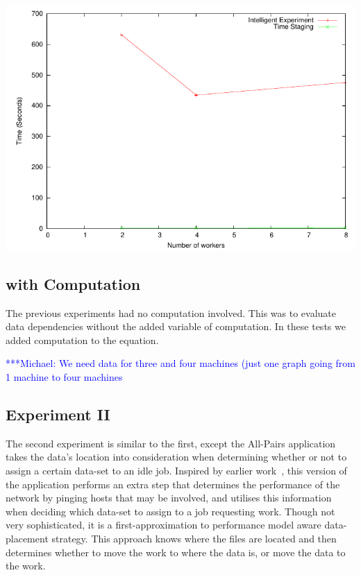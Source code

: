 \documentclass{rspublic}
\newcommand{\micnote}[1]{ {\textcolor{blue} { ***Michael: #1 }}} \else
\newcommand{\jhanote}[1]{} \newcommand{\micnote}[1]{} \newcommand{\fixme}[1]{}
\begin{document}
\includegraphics{data/graphs/StagingAsAPortionOfIntelligenceFigure}

\subsection{with Computation}
The previous experiments had no computation involved.  This was to
evaluate data dependencies without the added variable of computation.
In these tests we added computation to the equation.

\jhanote{We need data for compute (comparision) and I/O (only) for
different data-set sizes} \micnote{We need data for three and four
machines (just one graph going from 1 machine to four machines}

\subsection{Experiment II} The second experiment is similar to the
first, except the All-Pairs application takes the data's location into
consideration when determining whether or not to assign a certain
data-set to an idle job.  Inspired by earlier work~\citep{netperf},
this version of the application performs an extra step that determines
the performance of the network by pinging hosts that may be involved,
and utilises this information when deciding which data-set to assign
to a job requesting work.  Though not very sophisticated, it is a
first-approximation to performance model aware data-placement strategy.
This approach knows where the files are located and then determines
whether to move the work to where the data is, or move the data to the
work.  \jhanote{Data-aware placement is also required, i.e., managing
location of files.}
\end{document}

